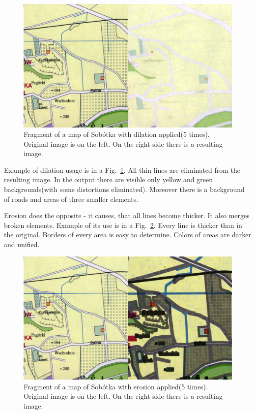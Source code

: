 \documentclass[a4paper,onecolumn,oneside,12pt]{memoir}
\begin{document}
\begin{figure}[!ht]
\begin{center}
\includegraphics[scale=1.0]{images/dilationResult.png}
\caption{Fragment of a map of Sobótka with dilation applied(5 times). \\
Original image is on the left. On the right side there is a resulting image.}
\label{dilationResult}
\end{center}
\end{figure}

Example of dilation usage is in a Fig.~\ref{dilationResult}. All thin lines are eliminated from the
resulting image. In the output there are visible only yellow and green backgrounds(with some
distortions eliminated). Moreover there is a background of roads and areas of three smaller
elements.

Erosion does the opposite - it causes, that all lines become thicker. It also merges broken
elements. Example of its use is in a Fig.~\ref{erosionResult}. Every line is thicker than in the
original. Borders of every area is easy to determine. Colors of areas are darker and unified.

\begin{figure}[!ht]
\begin{center}
\includegraphics[scale=1.0]{images/erosionResult.png}
\caption{Fragment of a map of Sobótka with erosion applied(5 times). Original image is on the left.
On the right side there is a resulting image.}
\label{erosionResult}
\end{center}
\end{figure}
\end{document}
